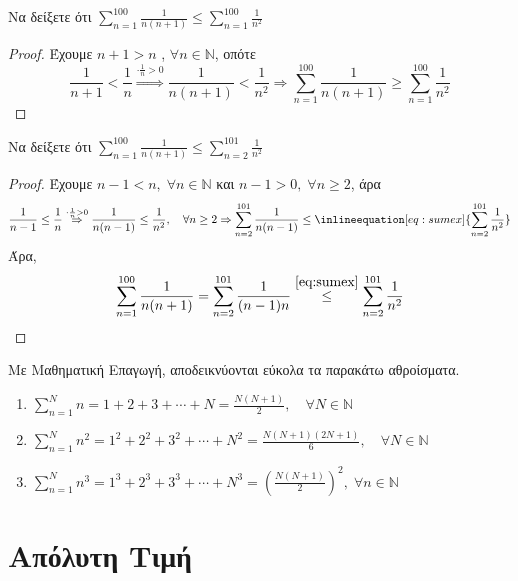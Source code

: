\documentclass[main.tex]{subfiles}
\begin{document}
\begin{example}
  Να δείξετε ότι $ \sum_{n=1}^{100} \frac{1}{n(n+1)} \leq \sum_{n=1}^{100} 
  \frac{1}{n^{2}} $
\end{example}
\begin{proof}
\item {} 
  Έχουμε $ n+1 > n $ , $ \forall n \in \mathbb{N} $, οπότε
  \[
    \frac{1}{n+1} < \frac{1}{n} \overset{\cdot \frac{1}{n} >0}{\Rightarrow}
    \frac{1}{n(n+1)} < \frac{1}{n^{2}} \Rightarrow \sum_{n=1}^{100} 
    \frac{1}{n(n+1)} \geq \sum_{n=1}^{100} \frac{1}{n^{2}} 
  \] 
\end{proof}

\begin{exercise}
  Να δείξετε ότι $ \sum_{n=1}^{100} \frac{1}{n(n+1)} \leq \sum_{n=2}^{101} 
  \frac{1}{n^{2}} $
\end{exercise} 
\begin{proof}
\item {} 
  Έχουμε $ n-1 < n, \; \forall n \in \mathbb{N} $ και 
  $ n-1>0, \; \forall n \geq 2 $, άρα
  \[
    \frac{1}{n-1} \leq \frac{1}{n} \overset{\cdot \frac{1}{n} >0}{\Rightarrow}
    \frac{1}{n(n-1)} \leq \frac{1}{n^{2}}, \quad \forall n \geq 2 \Rightarrow 
    \sum_{n=2}^{101} \frac{1}{n(n-1)} \leq 
    \inlineequation[eq:sumex]{\sum_{n=2}^{101} \frac{1}{n^{2}}}
  \] 
  Άρα, 
  \[
    \sum_{n=1}^{100} \frac{1}{n(n+1)} = \sum_{n=2}^{101} \frac{1}{(n-1)n} 
    \overset{\eqref{eq:sumex}}{\leq} \sum_{n=2}^{101} \frac{1}{n^{2}} 
  \]
\end{proof}

\begin{example}
  Με Μαθηματική Επαγωγή, αποδεικνύονται εύκολα τα παρακάτω αθροίσματα.
  \begin{enumerate}[wide,labelindent=0pt]
    \item $ \sum_{n=1}^{N} n = 1+2+3+\cdots+N = \frac{N(N+1)}{2}, 
      \quad \forall N \in \mathbb{N}  $
    \item $ \sum_{n=1}^{N} n^{2} =1^{2}+2^{2}+3^{2}+\cdots+N^{2} = 
      \frac{N(N+1)(2N+1)}{6}, \quad \forall N \in \mathbb{N} $
    \item $ \sum_{n=1}^{N} n^{3} = 1^{3}+2^{3}+3^{3}+\cdots +N^{3} =
      \left(\frac{N(N+1)}{2}
      \right)^{2}, \; \forall n \in \mathbb{N}$
  \end{enumerate}
\end{example}

\section{Απόλυτη Τιμή}
\end{document}
